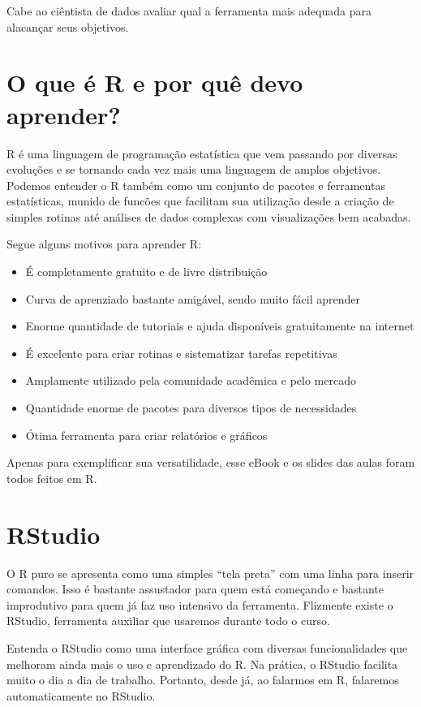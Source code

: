 \documentclass[]{book}
\providecommand{\tightlist}{%
  \setlength{\itemsep}{0pt}\setlength{\parskip}{0pt}}
\begin{document}
Cabe ao ciêntista de dados avaliar qual a ferramenta mais adequada para
alacançar seus objetivos.

\section{O que é R e por quê devo
aprender?}\label{o-que-e-r-e-por-que-devo-aprender}

R é uma linguagem de programação estatística que vem passando por
diversas evoluções e se tornando cada vez mais uma linguagem de amplos
objetivos. Podemos entender o R também como um conjunto de pacotes e
ferramentas estatísticas, munido de funcões que facilitam sua utilização
desde a criação de simples rotinas até análises de dados complexas com
visualizações bem acabadas.

Segue alguns motivos para aprender R:

\begin{itemize}
\tightlist
\item
  É completamente gratuito e de livre distribuição
\item
  Curva de aprenziado bastante amigável, sendo muito fácil aprender
\item
  Enorme quantidade de tutoriais e ajuda disponíveis gratuitamente na
  internet
\item
  É excelente para criar rotinas e sistematizar tarefas repetitivas
\item
  Amplamente utilizado pela comunidade acadêmica e pelo mercado
\item
  Quantidade enorme de pacotes para diversos tipos de necessidades
\item
  Ótima ferramenta para criar relatórios e gráficos
\end{itemize}

Apenas para exemplificar sua versatilidade, esse eBook e os slides das
aulas foram todos feitos em R.

\section{RStudio}\label{rstudio}

O R puro se apresenta como uma simples ``tela preta'' com uma linha para
inserir comandos. Isso é bastante assustador para quem está começando e
bastante improdutivo para quem já faz uso intensivo da ferramenta.
Flizmente existe o RStudio, ferramenta auxiliar que usaremos durante
todo o curso.

Entenda o RStudio como uma interface gráfica com diversas
funcionalidades que melhoram ainda mais o uso e aprendizado do R. Na
prática, o RStudio facilita muito o dia a dia de trabalho. Portanto,
desde já, ao falarmos em R, falaremos automaticamente no RStudio.
\end{document}
